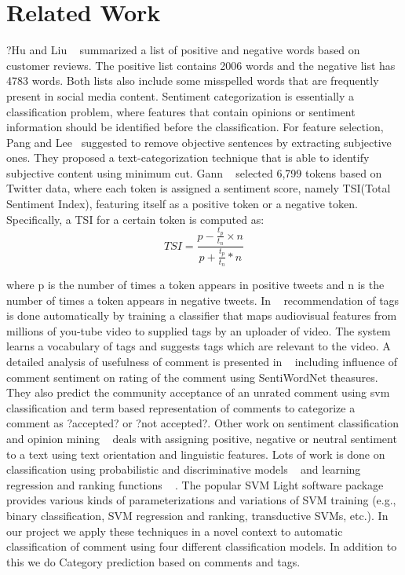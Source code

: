 \section{Related Work}
\label{sec:rel}
?Hu and Liu ~\cite{HuM} summarized a list of positive and negative words based on customer reviews.
The positive list contains 2006 words and the negative list has 4783 words. Both lists also include some misspelled words that are frequently present in social media content.
Sentiment categorization is essentially a classification problem, where features that contain opinions or sentiment information should be identified before the classification.
For feature selection, Pang and Lee ~\cite{PangLee}suggested to remove objective sentences by extracting subjective ones.
They proposed a text-categorization technique that is able to identify subjective content using minimum cut.
Gann ~\cite{Gann} selected 6,799 tokens based on Twitter data, where each token is assigned a sentiment score, namely TSI(Total Sentiment Index), featuring itself as a positive token or a negative token.
Specifically, a TSI for a certain token is computed as:
$$TSI=\frac{p-\frac{t_p}{t_n} \times n}{p+\frac{t_p}{t_n}*n}$$

where p is the number of times a token appears in positive tweets and n is the number of times a token appears in negative tweets.
In ~\cite{ tagRecCatDis} recommendation of tags is done automatically by training a classifier that maps audiovisual features from millions of you-tube video to supplied tags by an uploader of video.
The system learns a vocabulary of tags and suggests tags which are relevant to the video.
A detailed analysis of usefulness of comment is presented in ~\cite{ Siersdorfer:2010:UYC:1772690.1772781} including influence of comment sentiment on rating of the comment using SentiWordNet theasures.
They also predict the community acceptance of an unrated comment using svm classification and term based representation  of comments to categorize a comment as  ?accepted? or ?not accepted?.
Other work on sentiment classification and opinion mining ~\cite{thumbsup} deals with assigning positive, negative or neutral sentiment to a text using text orientation and linguistic features.
Lots of work is done on classification using probabilistic and discriminative models ~\cite{Chakrabarti} and learning regression and ranking functions ~\cite{Smola} .
The popular SVM Light software package ~\cite{Joachims} provides various kinds of parameterizations and variations of SVM training (e.g., binary classification, SVM regression and ranking, transductive SVMs, etc.).
In our project we apply these techniques in a novel context to automatic classification of comment using four different classification models.
In addition to this we do Category prediction based on comments and tags.
